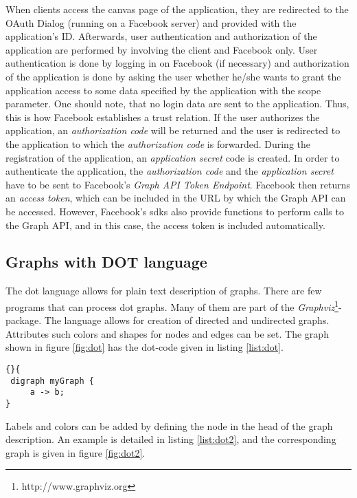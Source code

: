 \documentclass[preprint,12pt]{elsarticle}
\begin{document}
When clients access the canvas page of the application, they are
redirected to the OAuth Dialog (running on a Facebook server) and
provided with the application's ID. Afterwards, user authentication and
authorization of the application are performed by involving the client and Facebook
only. User authentication is done by logging in on Facebook (if necessary) and
authorization of the application is done by asking the user whether he/she
wants to grant the application access to some data specified by the
application with the scope parameter. One should note, that no
login data are sent to the application. Thus, this is how Facebook
establishes a trust relation. 
If the user authorizes the application, an \textit{authorization code}
will be returned and
the user is redirected to the application to which the
\textit{authorization code} is forwarded. During the registration of the
application, an \textit{application secret} code is
created. In order to authenticate the application, the
\textit{authorization code} and the \textit{application secret} have
to be sent to Facebook's \textit{Graph API Token Endpoint}. Facebook
then returns an \textit{access token}, which can be included in the
URL by which the Graph API can be accessed. However, Facebook's
\ac{sdks} also provide functions to perform calls to the Graph API,
and in this case, the access token is included automatically.

\subsection{Graphs with DOT language}
\label{sec:graph-repr-with}
The \ac{dot} language allows for plain text description of
graphs. There are few programs that can process \ac{dot} graphs. Many
of them are part of the
\textit{Graphviz}\footnote{http://www.graphviz.org}-package. 
The language allows for creation of directed and undirected graphs. Attributes such
colors and shapes for nodes and edges can
be set. The graph shown in figure
\ref{fig:dot} has the \ac{dot}-code given in listing \ref{list:dot}.

\begin{lstlisting}[caption=A very simple DOT-Graph,
  label=list:dot]{}{
 digraph myGraph {
     a -> b;
}
\end{lstlisting}

Labels and colors can be added by defining the node in the head of the
graph description. An example is detailed in listing \ref{list:dot2}, and
the corresponding graph is given in figure \ref{fig:dot2}.
\end{document}
